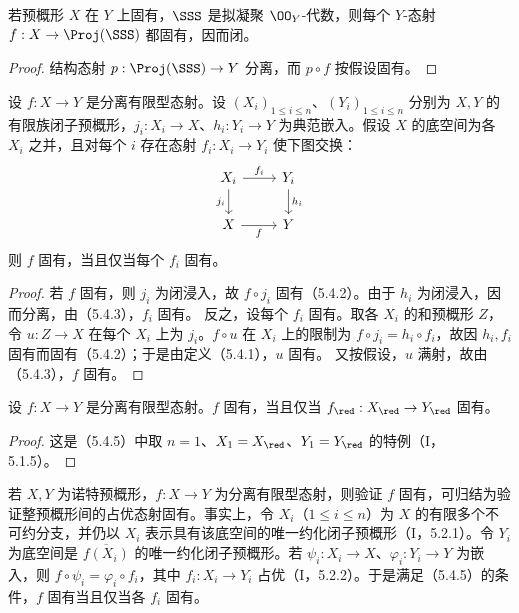 若预概形 $X$ 在 $Y$ 上固有，$\SSS$ 是拟凝聚 $\OO_Y$-代数，则每个 $Y$-态射 $f:X\to\Proj(\SSS)$ 都固有，因而闭。
\begin{proof}
结构态射 $p:\Proj(\SSS)\to Y$ 分离，而 $p\circ f$ 按假设固有。
\end{proof}

设 $f:X\to Y$ 是分离有限型态射。设 $(X_i)_{1\leq i\leq n}$、$(Y_i)_{1\leq i\leq n}$ 分别为 $X,Y$ 的有限族闭子预概形，$j_i:X_i\to X$、$h_i:Y_i\to Y$ 为典范嵌入。假设 $X$ 的底空间为各 $X_i$ 之并，且对每个 $i$ 存在态射 $f_i:X_i\to Y_i$ 使下图交换：
\[
\begin{tikzcd}
X_i\arrow[r,"f_i"]\arrow[d,"j_i"']&Y_i\arrow[d,"h_i"]\\
X\arrow[r,"f"']&Y
\end{tikzcd}
\]
则 $f$ 固有，当且仅当每个 $f_i$ 固有。
\begin{proof}
若 $f$ 固有，则 $j_i$ 为闭浸入，故 $f\circ j_i$ 固有（5.4.2）。由于 $h_i$ 为闭浸入，因而分离，由（5.4.3），$f_i$ 固有。
反之，设每个 $f_i$ 固有。取各 $X_i$ 的和预概形 $Z$，令 $u:Z\to X$ 在每个 $X_i$ 上为 $j_i$。$f\circ u$ 在 $X_i$ 上的限制为
$f\circ j_i=h_i\circ f_i$，故因 $h_i,f_i$ 固有而固有（5.4.2）；于是由定义（5.4.1），$u$ 固有。
又按假设，$u$ 满射，故由（5.4.3），$f$ 固有。
\end{proof}

设 $f:X\to Y$ 是分离有限型态射。$f$ 固有，当且仅当 $f_{\red}:X_{\red}\to Y_{\red}$ 固有。
\begin{proof}
这是（5.4.5）中取 $n=1$、$X_1=X_{\red}$、$Y_1=Y_{\red}$ 的特例（I，5.1.5）。
\end{proof}

若 $X,Y$ 为诺特预概形，$f:X\to Y$ 为分离有限型态射，则验证 $f$ 固有，可归结为验证整预概形间的占优态射固有。事实上，令 $X_i$（$1\leq i\leq n$）为 $X$ 的有限多个不可约分支，并仍以 $X_i$ 表示具有该底空间的唯一约化闭子预概形（I，5.2.1）。令 $Y_i$ 为底空间是 $\overline{f(X_i)}$ 的唯一约化闭子预概形。若 $\psi_i:X_i\to X$、$\varphi_i:Y_i\to Y$ 为嵌入，则
$f\circ\psi_i=\varphi_i\circ f_i$，其中 $f_i:X_i\to Y_i$ 占优（I，5.2.2）。于是满足（5.4.5）的条件，$f$ 固有当且仅当各 $f_i$ 固有。

